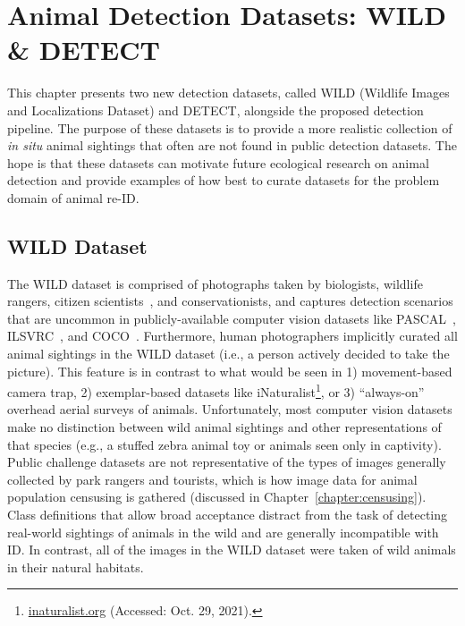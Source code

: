 \section{Animal Detection Datasets: WILD \& DETECT}

This chapter presents two new detection datasets, called WILD (Wildlife Images and Localizations Dataset) and DETECT, alongside the proposed detection pipeline.  The purpose of these datasets is to provide a more realistic collection of \textit{in situ} animal sightings that often are not found in public detection datasets.  The hope is that these datasets can motivate future ecological research on animal detection and provide examples of how best to curate datasets for the problem domain of animal re-ID.

\subsection{WILD Dataset}

The WILD dataset is comprised of photographs taken by biologists, wildlife rangers, citizen scientists~\cite{irwin_citizen_1995}, and conservationists, and captures detection scenarios that are uncommon in publicly-available computer vision datasets like PASCAL~\cite{everingham_pascal_2010}, ILSVRC~\cite{russakovsky_imagenet_2015}, and COCO~\cite{lin_microsoft_2014}.  Furthermore, human photographers implicitly curated all animal sightings in the WILD dataset (i.e., a person actively decided to take the picture).  This feature is in contrast to what would be seen in 1) movement-based camera trap, 2) exemplar-based datasets like iNaturalist\footnote{\url{inaturalist.org} (Accessed: Oct. 29, 2021).}, or 3) ``always-on'' overhead aerial surveys of animals.  Unfortunately, most computer vision datasets make no distinction between wild animal sightings and other representations of that species (e.g., a stuffed zebra animal toy or animals seen only in captivity).  Public challenge datasets are not representative of the types of images generally collected by park rangers and tourists, which is how image data for animal population censusing is gathered (discussed in Chapter~\ref{chapter:censusing}).  Class definitions that allow broad acceptance distract from the task of detecting real-world sightings of animals in the wild and are generally incompatible with ID.  In contrast, all of the images in the WILD dataset were taken of wild animals in their natural habitats.


